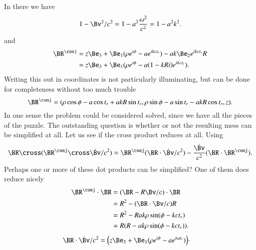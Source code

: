{In there we have
%
\begin{equation}\label{eqn:relativisticElectrodynamicsExamReflection:580}
1 - \Bv^2/c^2 = 1 - a^2 \frac{\omega^2}{c^2} = 1 - a^2 k^2.
\end{equation}
%
and
%
\begin{equation}\label{eqn:relativisticElectrodynamicsExamReflection:1090}
\begin{aligned}
\BR^\conj
&=
z \Be_3 + \Be_1 (\rho e^{i \phi} - a e^{i k c t_r} )
-
a k \Be_2 e^{i k c t_r} R \\
&=
z \Be_3 + \Be_1 (\rho e^{i \phi} - a (1 - k R i) e^{i k c t_r} ).
\end{aligned}
\end{equation}
%
Writing this out in coordinates is not particularly illuminating, but can be done for completeness without too much trouble
%
\begin{equation}\label{eqn:relativisticElectrodynamicsExamReflection:600}
\BR^\conj =
( \rho \cos\phi - a \cos t_r + a k R \sin t_r,
  \rho \sin\phi - a \sin t_r - a k R \cos t_r,
  z ).
\end{equation}
%
In one sense the problem could be considered solved, since we have all the pieces of the puzzle.  The outstanding question is whether or not the resulting mess can be simplified at all.  Let us see if the cross product reduces at all.  Using
%
\begin{equation}\label{eqn:relativisticElectrodynamicsExamReflection:620}
\BR \cross (\BR^\conj \cross \dot{\Bv}/c^2)
=
\BR^\conj (\BR \cdot \dot{\Bv}/c^2)
- \frac{\dot{\Bv}}{c^2}
(\BR \cdot \BR^\conj).
\end{equation}
%
Perhaps one or more of these dot products can be simplified?  One of them does reduce nicely
%
\begin{equation}\label{eqn:relativisticElectrodynamicsExamReflection:1110}
\begin{aligned}
\BR^\conj \cdot \BR
&= ( \BR - R \Bv/c ) \cdot \BR  \\
&= R^2 - (\BR \cdot \Bv/c) R \\
&= R^2 - R a k \rho \sin(\phi - k c t_r) \\
&= R(R - a k \rho \sin(\phi - k c t_r)).
\end{aligned}
\end{equation}
%
\begin{equation}\label{eqn:relativisticElectrodynamicsExamReflection:1130}
\begin{aligned}
\BR \cdot \dot{\Bv}/c^2
&=
\Bigl(z \Be_3 + \Be_1 (\rho e^{i \phi} - a e^{i \omega t_r} ) \Bigr) \cdot

\end{aligned}
\end{equation}}
